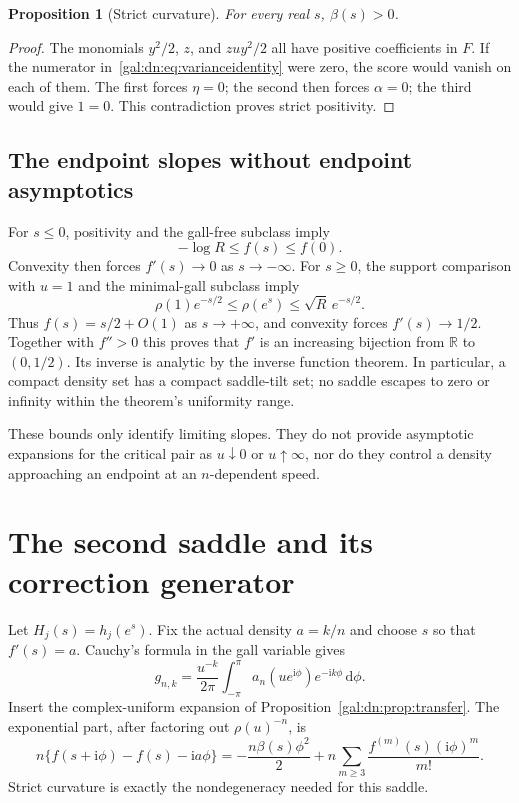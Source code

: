 \documentclass[11pt,letterpaper]{article}
\numberwithin{equation}{section}
\newtheorem{proposition}[theorem]{Proposition}
\theoremstyle{definition}\newtheorem{definition}[theorem]{Definition}
\theoremstyle{remark}\newtheorem{remark}[theorem]{Remark}
\newcommand{\ii}{\mathrm i}
\newcommand{\dd}{\mathrm d}
\newcommand{\R}{\mathbb R}
\begin{document}
\begin{proposition}[Strict curvature]\label{gal:dn:prop:strictbeta}
For every real $s$, $\beta(s)>0$.
\end{proposition}
\begin{proof}
The monomials $y^2/2$, $z$, and $zu y^2/2$ all have positive coefficients in $F$. If the numerator in~\eqref{gal:dn:eq:varianceidentity} were zero, the score would vanish on each of them. The first forces $\eta=0$; the second then forces $\alpha=0$; the third would give $1=0$. This contradiction proves strict positivity.
\end{proof}

\subsection{The endpoint slopes without endpoint asymptotics}
For $s\leq0$, positivity and the gall-free subclass imply
\[
 -\log R\leq f(s)\leq f(0).
\]
Convexity then forces $f'(s)\to0$ as $s\to-\infty$. For $s\geq0$, the support comparison with $u=1$ and the minimal-gall subclass imply
\begin{equation}\label{gal:dn:eq:endpointbounds}
 \rho(1)e^{-s/2}\leq\rho(e^s)\leq\sqrt R\,e^{-s/2}.
\end{equation}
Thus $f(s)=s/2+O(1)$ as $s\to+\infty$, and convexity forces $f'(s)\to1/2$. Together with $f''>0$ this proves that $f'$ is an increasing bijection from $\R$ to $(0,1/2)$. Its inverse is analytic by the inverse function theorem. In particular, a compact density set has a compact saddle-tilt set; no saddle escapes to zero or infinity within the theorem's uniformity range.

These bounds only identify limiting slopes. They do not provide asymptotic expansions for the critical pair as $u\downarrow0$ or $u\uparrow\infty$, nor do they control a density approaching an endpoint at an $n$-dependent speed.

\section{The second saddle and its correction generator}\label{gal:dn:sec:density}
Let $H_j(s)=h_j(e^s)$. Fix the actual density $a=k/n$ and choose $s$ so that $f'(s)=a$. Cauchy's formula in the gall variable gives
\begin{equation}\label{gal:dn:eq:cintegral}
 g_{n,k}=\frac{u^{-k}}{2\pi}\int_{-\pi}^{\pi}
 a_n(ue^{\ii\phi})e^{-\ii k\phi}\,\dd\phi.
\end{equation}
Insert the complex-uniform expansion of Proposition~\ref{gal:dn:prop:transfer}. The exponential part, after factoring out $\rho(u)^{-n}$, is
\begin{equation}\label{gal:dn:eq:phaseexpand}
 n\{f(s+\ii\phi)-f(s)-\ii a\phi\}
 =-\frac{n\beta(s)\phi^2}2
 +n\sum_{m\geq3}\frac{f^{(m)}(s)(\ii\phi)^m}{m!}.
\end{equation}
Strict curvature is exactly the nondegeneracy needed for this saddle.
\end{document}
